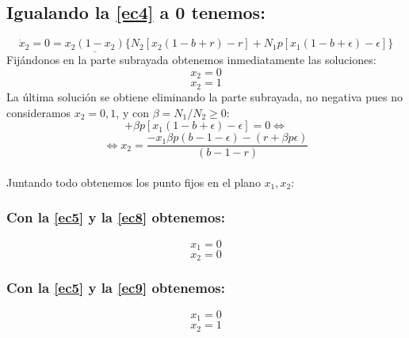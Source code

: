 \documentclass[11pt]{article}
\begin{document}
\newpage

\subsection*{Igualando la \autoref{ec4} a 0 tenemos:}
\begin{equation*}
\dot{x}_2=0=\underline{x_2(1-x_2)}\lbrace N_2[x_2(1-b+r)-r]+N_1p[x_1(1-b+\epsilon)-\epsilon]\rbrace
\end{equation*}
Fijándonos en la parte subrayada obtenemos inmediatamente las soluciones:
\begin{equation}\label{ec8}
x_2=0
\end{equation}
\begin{equation}\label{ec9}
x_2=1
\end{equation}
La última solución se obtiene eliminando la parte subrayada, no  negativa pues no consideramos $x_2=0,1$, y con $\beta=N_1/N_2\geq0$:
\begin{equation*}
[x_2(1-b+r)-r]+\beta p[x_1(1-b+\epsilon)-\epsilon]=0\Longleftrightarrow
\end{equation*}
\begin{equation}\label{ec10}
\Longleftrightarrow x_2=\dfrac{-x_1\beta p(b-1-\epsilon)-(r+\beta p\epsilon)}{(b-1-r)}
\end{equation}\\

Juntando todo obtenemos los punto fijos en el plano $x_1,x_2$:

\subsubsection*{Con la \autoref{ec5} y la \autoref{ec8} obtenemos:}
\vspace{-0.7cm}
\begin{equation}\label{ec11}
x_1=0
\end{equation}
\begin{equation}\label{ec12}
x_2=0
\end{equation}

\subsubsection*{Con la \autoref{ec5} y la \autoref{ec9} obtenemos:}
\vspace{-0.7cm}
\begin{equation}\label{ec13}
x_1=0
\end{equation}
\begin{equation}\label{ec14}
x_2=1
\end{equation}
\end{document}

